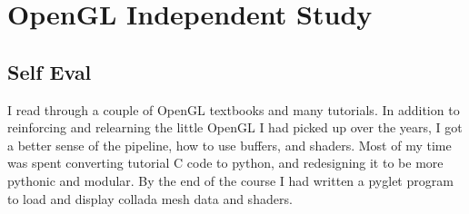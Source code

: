\section{OpenGL Independent Study}

\begin{meta}
\end{meta}


\subsection*{Self Eval}
I read through a couple of OpenGL textbooks and many tutorials. In
addition to reinforcing and relearning the little OpenGL I had picked
up over the years, I got a better sense of the pipeline, how to use
buffers, and shaders. Most of my time was spent converting tutorial C
code to python, and redesigning it to be more pythonic and modular. By
the end of the course I had written a pyglet program to load and display
collada mesh data and shaders.

\vspace{1.5in}
